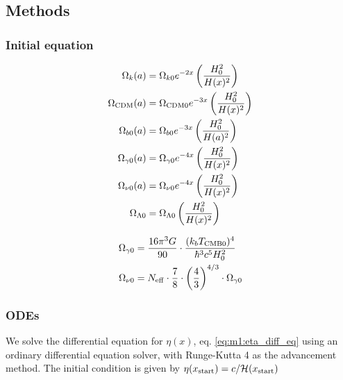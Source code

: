 \subsection{Methods}\label{sec:m1:methods}

\subsubsection{Initial equation}

\begin{equation}\label{eq:m1:density_evolutions}
    \begin{split}
        \Omega_k(a) &= \Omega_{k0}e^{-2x}\left( \frac{H_0^2}{H(x)^2}\right) \\
        \Omega_{\text{CDM}}(a) &=\Omega_{\text{CDM}0}e^{-3x}\left( \frac{H_0^2}{H(x)^2}\right)\\
        \Omega_{b0}(a) &=\Omega_{b0}e^{-3x}\left( \frac{H_0^2}{H(a)^2}\right)\\
        \Omega_{\gamma0}(a) &=\Omega_{\gamma0}e^{-4x}\left( \frac{H_0^2}{H(x)^2}\right)\\
        \Omega_{\nu0}(a) &=\Omega_{\nu0}e^{-4x}\left( \frac{H_0^2}{H(x)^2}\right)\\
        \Omega_{\Lambda0} &=\Omega_{\Lambda0}\left( \frac{H_0^2}{H(x)^2}\right)
    \end{split}
\end{equation}


\begin{equation}\label{eq:m1:radiation_densities}
    \begin{split}
        \Omega_{\gamma0} &= \frac{16\pi^3G}{90}\cdot\frac{(k_b T_{\mathrm{CMB}0})^4}{\hbar^3c^5H_0^2} \\
        \Omega_{\nu0} &= N_\mathrm{eff} \cdot\frac{7}{8} \cdot \left( \frac{4}{3} \right)^{4/3}\cdot \Omega_{\gamma0}
    \end{split}
\end{equation}

\subsubsection{ODEs}

We solve the differential equation for $\eta(x)$, eq. \ref{eq:m1:eta_diff_eq} using an ordinary differential equation solver, with Runge-Kutta 4 as the advancement method. The initial condition is given by $\eta(x_\mathrm{start})=c/\mathcal{H}(x_\mathrm{start})$